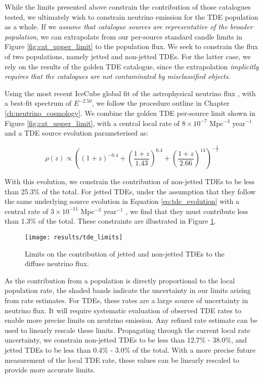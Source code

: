 While the limits presented above constrain the contribution of those catalogues tested, we ultimately wish to constrain neutrino emission for the TDE population as a whole. If we \emph{assume that catalogue sources are representative of the broader population}, we can extrapolate from our per-source standard candle limits in Figure \ref{fig:cat_upper_limit} to the population flux. We seek to constrain the flux of two populations, namely jetted and non-jetted TDEs. For the latter case, we rely on the results of the golden TDE catalogue, since the extrapolation \emph{implicitly requires that the catalogues are not contaminated by misclassified objects}.

Using the most recent IceCube global fit of the astrophysical neutrino flux , with a best-fit spectrum of $E^{-2.50}$, we follow the procedure outline in Chapter \ref{ch:neutrino_cosmology}. We combine the golden TDE per-source limit shown in Figure \ref{fig:cat_upper_limit}, with a central local rate of $8 \times 10^{-7}$ Mpc$^{-3}$ year$^{-1}$  and a TDE source evolution  parameterised as:

\begin{equation}
\rho(z) \propto \left( (1 + z)^{-0.4} + \left( \frac{1 + z}{1.43} \right)^{6.4} +
\left( \frac{1 + z}{2.66} \right)^{14}
\right)^{-\frac{1}{2}}
\label{eq:tde_evolution}
\end{equation}

With this evolution, we constrain the contribution of non-jetted TDEs to be less than 25.3\% of the total. For jetted TDEs, under the assumption that they follow the same underlying source evolution in Equation \ref{eq:tde_evolution} with a central rate of $3 \times 10^{-11}$ Mpc$^{-3}$ year$^{-1}$ \cite{Sun:2015bda}, we find that they must contribute less than 1.3\% of the total.  These constraints are illustrated in Figure \ref{fig:DiffuseFlux}. 

\begin{figure}[!ht]
	\centering \texttt{[image: results/tde\_limits]}
	\caption{Limits on the contribution of jetted and non-jetted TDEs to the diffuse neutrino flux.}
	\label{fig:DiffuseFlux}
\end{figure}

As the contribution from a population is directly proportional to the local population rate, the shaded bands indicate the uncertainty in our limits arising from rate estimates. For TDEs, these rates are a large source of uncertainty in neutrino flux. It will require systematic evaluation of observed TDE rates to enable more precise limits on neutrino emission. Any refined rate estimate can be used to linearly rescale these limits. Propagating through the current local rate uncertainty, we constrain non-jetted TDEs to be less than 12.7\% - 38.0\%, and jetted TDEs to be less than 0.4\% - 3.0\% of the total. With a more precise future measurement of the local TDE rate, these values can be linearly rescaled to provide more accurate limits.


